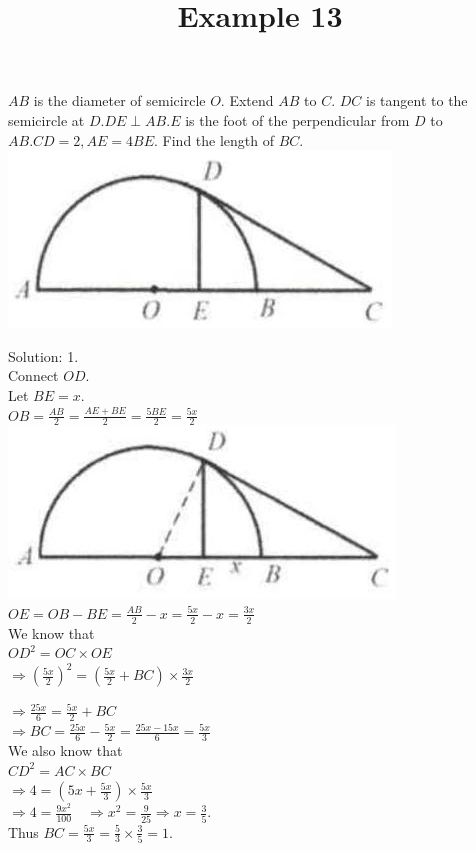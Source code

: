 \documentclass{article}
\title{Example 13}
\date{}
\begin{document}
\maketitle

\(A B\) is the diameter of semicircle \(O\). Extend \(A B\) to \(C\). \(D C\) is tangent to the semicircle at \(D . D E \perp A B . E\) is the foot of the perpendicular from \(D\) to \(A B . C D=2, A E=4 B E\). Find the length of \(B C\).\\
\centering
\includegraphics[width=\textwidth]{images/problem_image_1.jpg}

Solution: 1.\\
Connect \(O D\).\\
Let \(B E=x\).\\
\(O B=\frac{A B}{2}=\frac{A E+B E}{2}=\frac{5 B E}{2}=\frac{5 x}{2}\)\\
\centering
\includegraphics[width=\textwidth]{images/reasoning_image_1.jpg}\\
\(O E=O B-B E=\frac{A B}{2}-x=\frac{5 x}{2}-x=\frac{3 x}{2}\)\\
We know that\\
\(O D^{2}=O C \times O E\)\\
\(\Rightarrow\left(\frac{5 x}{2}\right)^{2}=\left(\frac{5 x}{2}+B C\right) \times \frac{3 x}{2}\)


\(\Rightarrow \frac{25 x}{6}=\frac{5 x}{2}+B C\)\\
\(\Rightarrow B C=\frac{25 x}{6}-\frac{5 x}{2}=\frac{25 x-15 x}{6}=\frac{5 x}{3}\)\\
We also know that\\
\(C D^{2}=A C \times B C\)\\
\(\Rightarrow 4=\left(5 x+\frac{5 x}{3}\right) \times \frac{5 x}{3}\)\\
\(\Rightarrow 4=\frac{9 x^{2}}{100} \quad \Rightarrow x^{2}=\frac{9}{25} \Rightarrow x=\frac{3}{5}\).\\
Thus \(B C=\frac{5 x}{3}=\frac{5}{3} \times \frac{3}{5}=1\).
\end{document}
